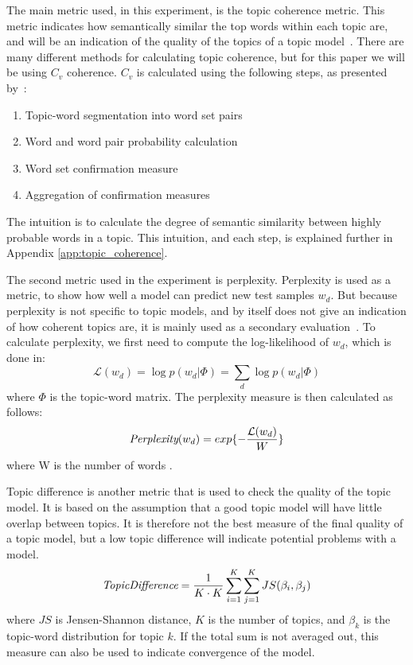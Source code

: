 The main metric used, in this experiment, is the topic coherence metric.
This metric indicates how semantically similar the top words within each topic are, and will be an indication of the quality of the topics of a topic model~\cite{topic_coherence_2015}.
There are many different methods for calculating topic coherence, but for this paper we will be using $C_v$ coherence.
$C_v$ is calculated using the following steps, as presented by~\citet{Syed2017coherence}:
\begin{enumerate}
	\item Topic-word segmentation into word set pairs
	\item Word and word pair probability calculation
	\item Word set confirmation measure
	\item Aggregation of confirmation measures
\end{enumerate}
The intuition is to calculate the degree of semantic similarity between highly probable words in a topic.
This intuition, and each step, is explained further in Appendix \autoref{app:topic_coherence}.

The second metric used in the experiment is perplexity.
Perplexity is used as a metric, to show how well a model can predict new test samples $w_d$.
But because perplexity is not specific to topic models, and by itself does not give an indication of how coherent topics are, it is mainly used as a secondary evaluation~\cite{tea_leaves}.
To calculate perplexity, we first need to compute the log-likelihood of $w_d$, which is done in:
\begin{equation}\label{eq:likelihood}
	\mathcal{L}(w_d) = \log p(w_d|\Phi) = \sum_{d} \log p(w_d|\Phi)
\end{equation}
\noindent where $\Phi$ is the topic-word matrix.
The perplexity measure is then calculated as follows:
\begin{equation}
	\emph{Perplexity}(w_d) = exp \{-\frac{\mathcal{L}(w_d)}{W}\}
\end{equation}
\noindent where W is the number of words \cite{de2008evaluating}.

Topic difference is another metric that is used to check the quality of the topic model.
It is based on the assumption that a good topic model will have little overlap between topics.
It is therefore not the best measure of the final quality of a topic model, but a low topic difference will indicate potential problems with a model.
\begin{equation}
	\emph{TopicDifference} = \frac{1}{K \cdot K} \sum_{i=1}^{K} \sum_{j=1}^{K} JS(\beta_{i},\beta_{j})
\end{equation}
\noindent where $JS$ is Jensen-Shannon distance, $K$ is the number of topics, and $\beta_{k}$ is the topic-word distribution for topic $k$.
If the total sum is not averaged out, this measure can also be used to indicate convergence of the model.

